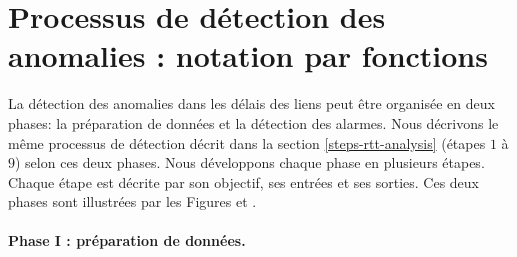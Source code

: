 \section{Processus de détection des anomalies :  notation par fonctions} \label{processus-de-detection}
La détection des anomalies dans les délais des liens peut être organisée en deux phases: la préparation de données et la détection des alarmes. Nous décrivons le même processus de détection décrit dans la section \ref{steps-rtt-analysis} (étapes $1$ à $9$)  selon ces deux phases. Nous développons chaque phase en plusieurs étapes. Chaque étape est décrite par  son objectif, ses entrées et ses sorties. Ces deux phases sont illustrées par les Figures et .
\paragraph{Phase I : préparation de données.}

